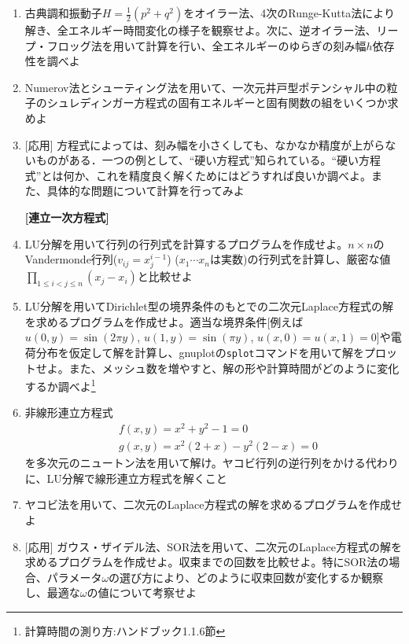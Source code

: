 \documentclass[11pt]{jarticle}
\begin{document}
\begin{enumerate}
\item 古典調和振動子$H=\frac{1}{2}(p^2+q^2)$をオイラー法、4次のRunge-Kutta法により解き、全エネルギー時間変化の様子を観察せよ。次に、逆オイラー法、リープ・フロッグ法を用いて計算を行い、全エネルギーのゆらぎの刻み幅$h$依存性を調べよ

\item Numerov法とシューティング法を用いて、一次元井戸型ポテンシャル中の粒子のシュレディンガー方程式の固有エネルギーと固有関数の組をいくつか求めよ
  
\item \mbox{} [応用] 方程式によっては、刻み幅を小さくしても、なかなか精度が上がらないものがある．一つの例として、``硬い方程式''知られている。``硬い方程式''とは何か、これを精度良く解くためにはどうすれば良いか調べよ。また、具体的な問題について計算を行ってみよ

  \hspace*{-2em} {\bf [連立一次方程式]}

\item LU分解を用いて行列の行列式を計算するプログラムを作成せよ。$n \times n$のVandermonde行列($v_{ij}=x_j^{i-1}$) ($x_1 \cdots x_n$は実数)の行列式を計算し、厳密な値$\displaystyle \prod_{1 \le i < j \le n} (x_j-x_i)$と比較せよ
  
\item LU分解を用いてDirichlet型の境界条件のもとでの二次元Laplace方程式の解を求めるプログラムを作成せよ。適当な境界条件[例えば$u(0,y) = \sin(2 \pi y)$, $u(1,y) = \sin(\pi y)$, $u(x,0)=u(x,1)=0$]や電荷分布を仮定して解を計算し、gnuplotの{\tt splot}コマンドを用いて解をプロットせよ。また、メッシュ数を増やすと、解の形や計算時間がどのように変化するか調べよ\footnote{計算時間の測り方:ハンドブック1.1.6節}

\item 非線形連立方程式
  \begin{align*}
    & f(x,y) = x^2 + y^2 - 1 = 0 \\
    & g(x,y) = x^2(2+x) - y^2 (2-x) = 0
  \end{align*}
  を多次元のニュートン法を用いて解け。ヤコビ行列の逆行列をかける代わりに、LU分解で線形連立方程式を解くこと

\item ヤコビ法を用いて、二次元のLaplace方程式の解を求めるプログラムを作成せよ

\item \mbox{} [応用] ガウス・ザイデル法、SOR法を用いて、二次元のLaplace方程式の解を求めるプログラムを作成せよ。収束までの回数を比較せよ。特にSOR法の場合、パラメータ$\omega$の選び方により、どのように収束回数が変化するか観察し、最適な$\omega$の値について考察せよ


\end{enumerate}
\end{document}
